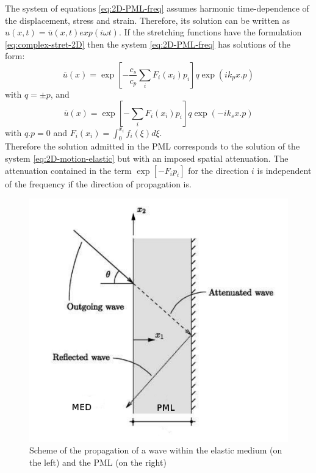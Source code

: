 The system of equations \ref{eq:2D-PML-freq} assumes harmonic time-dependence of the displacement, stress and strain. Therefore, its solution can be written as $u(x,t) = \overline{u}(x,t)exp(i \omega t)$. If the stretching functions have the formulation \ref{eq:complex-stret-2D} then the system \ref{eq:2D-PML-freq} has solutions of the form: 
\begin{equation}
\overline{u}(x) = \exp[-\frac{c_s}{c_p}\sum_i F_i(x_i)p_i ] q  \exp(i k_p x . p)
\end{equation}
with $q = \pm p$, and
\begin{equation}
\overline{u}(x) = \exp [ -\sum_i F_i(x_i)p_i ] q  \exp(- i k_s x . p)
\end{equation}
with $q.p=0$ and $F_i(x_i) = \int_0^{x_i} f_i(\xi) d\xi$.\\
Therefore the solution admitted in the PML corresponds to the solution of the system \ref{eq:2D-motion-elastic} but with an imposed spatial attenuation. 
The attenuation contained in the term $\exp[ - F_i p_i ]$ for the direction $i$ is independent of the frequency if the direction of propagation is. 


\begin{figure}[H]
\centering
\includegraphics[scale=0.5]{images/scheme-layers.png}
\caption{Scheme of the propagation of a wave within the elastic medium (on the left) and the PML (on the right)}
\label{fig:scheme-layers}
\end{figure} 
